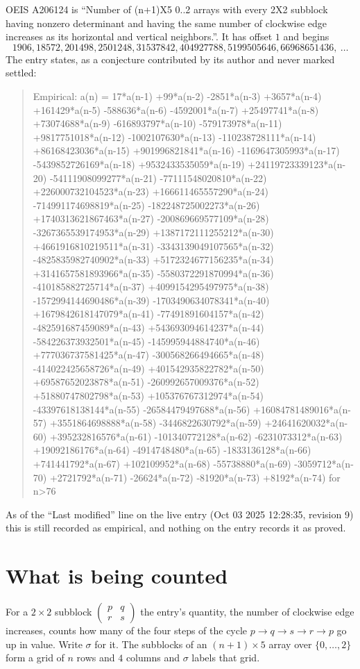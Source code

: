 \documentclass[11pt,a4paper]{article}
\theoremstyle{plain}
\theoremstyle{definition}
\begin{document}
OEIS A206124 is ``Number of (n+1)X5 0..2 arrays with every 2X2 subblock having nonzero determinant and having the same number of clockwise edge increases as its horizontal and vertical neighbors.''. It has offset $1$ and begins
\[
1906, 18572, 201498, 2501248, 31537842, 404927788, 5199505646, 66968651436,\ \dots
\]
The entry states, as a conjecture contributed by its author and never marked settled:
\begin{quote}
Empirical: a(n) = 17*a(n-1) +99*a(n-2) -2851*a(n-3) +3657*a(n-4) +161429*a(n-5) -588636*a(n-6) -4592001*a(n-7) +25497741*a(n-8) +73074688*a(n-9) -616893797*a(n-10) -579173978*a(n-11) +9817751018*a(n-12) -1002107630*a(n-13) -110238728111*a(n-14) +86168423036*a(n-15) +901996821841*a(n-16) -1169647305993*a(n-17) -5439852726169*a(n-18) +9532433535059*a(n-19) +24119723339123*a(n-20) -54111908099277*a(n-21) -77111548020810*a(n-22) +226000732104523*a(n-23) +166611465557290*a(n-24) -714991174698819*a(n-25) -182248725002273*a(n-26) +1740313621867463*a(n-27) -200869669577109*a(n-28) -3267365539174953*a(n-29) +1387172111255212*a(n-30) +4661916810219511*a(n-31) -3343139049107565*a(n-32) -4825835982740902*a(n-33) +5172324677156235*a(n-34) +3141657581893966*a(n-35) -5580372291870994*a(n-36) -410185882725714*a(n-37) +4099154295497975*a(n-38) -1572994144690486*a(n-39) -1703490634078341*a(n-40) +1679842618147079*a(n-41) -77491891604157*a(n-42) -482591687459089*a(n-43) +543693094614237*a(n-44) -584226373932501*a(n-45) -145995944884740*a(n-46) +777036737581425*a(n-47) -300568266494665*a(n-48) -414022425658726*a(n-49) +401542935822782*a(n-50) +69587652023878*a(n-51) -260992657009376*a(n-52) +51880747802798*a(n-53) +105376767312974*a(n-54) -43397618138144*a(n-55) -26584479497688*a(n-56) +16084781489016*a(n-57) +3551864698888*a(n-58) -3446822630792*a(n-59) +24641620032*a(n-60) +395232816576*a(n-61) -101340772128*a(n-62) -6231073312*a(n-63) +19092186176*a(n-64) -4914748480*a(n-65) -1833136128*a(n-66) +741441792*a(n-67) +102109952*a(n-68) -55738880*a(n-69) -3059712*a(n-70) +2721792*a(n-71) -26624*a(n-72) -81920*a(n-73) +8192*a(n-74) for n>76
\end{quote}
As of the ``Last modified'' line on the live entry (Oct 03 2025 12:28:35, revision 9) this is still
recorded as empirical, and nothing on the entry records it as proved.

\section{What is being counted}

For a $2\times2$ subblock $\begin{pmatrix}p&q\\r&s\end{pmatrix}$ the
entry's quantity, the number of clockwise edge increases, counts how many of the four steps of the cycle $p\to q\to s\to r\to p$ go up in value. Write $\sigma$ for it. The subblocks of an
$(n+1)\times5$ array over $\{0,\dots,2\}$ form a grid of $n$ rows and $4$
columns and $\sigma$ labels that grid.
\end{document}
